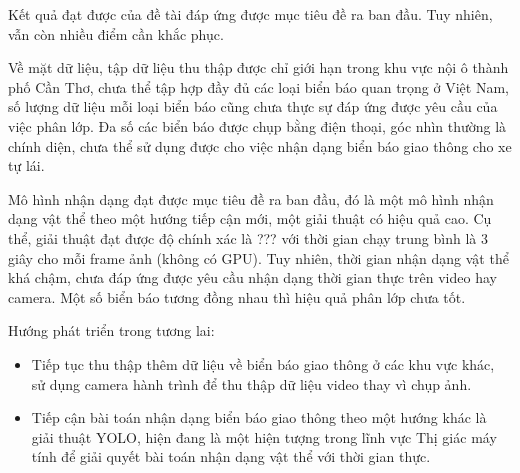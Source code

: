 \documentclass[../thesis.tex]{subfiles}
\begin{document}
Kết quả đạt được của đề tài đáp ứng được mục tiêu đề ra ban đầu. Tuy nhiên, vẫn còn nhiều điểm cần khắc phục.

Về mặt dữ liệu, tập dữ liệu thu thập được chỉ giới hạn trong khu vực nội ô thành phố Cần Thơ, chưa thể tập hợp đầy đủ các loại biển báo quan trọng ở Việt Nam, số lượng dữ liệu mỗi loại biển báo cũng chưa thực sự đáp ứng được yêu cầu của việc phân lớp. Đa số các biển báo được chụp bằng điện thoại, góc nhìn thường là chính diện, chưa thể sử dụng được cho việc nhận dạng biển báo giao thông cho xe tự lái.

Mô hình nhận dạng đạt được mục tiêu đề ra ban đầu, đó là một mô hình nhận dạng vật thể theo một hướng tiếp cận mới, một giải thuật có hiệu quả cao. Cụ thể, giải thuật đạt được độ chính xác là ??? với thời gian chạy trung bình là 3 giây cho mỗi frame ảnh (không có GPU). Tuy nhiên, thời gian nhận dạng vật thể khá chậm, chưa đáp ứng được yêu cầu nhận dạng thời gian thực trên video hay camera. Một số biển báo tương đồng nhau thì hiệu quả phân lớp chưa tốt.

Hướng phát triển trong tương lai:

\begin{itemize}
  \item Tiếp tục thu thập thêm dữ liệu về biển báo giao thông ở các khu vực khác, sử dụng camera hành trình để thu thập dữ liệu video thay vì chụp ảnh.
  \item Tiếp cận bài toán nhận dạng biển báo giao thông theo một hướng khác là giải thuật YOLO\cite{DBLP:journals/corr/RedmonDGF15}, hiện đang là một hiện tượng trong lĩnh vực Thị giác máy tính để giải quyết bài toán nhận dạng vật thể với thời gian thực.
\end{itemize}
\end{document}
